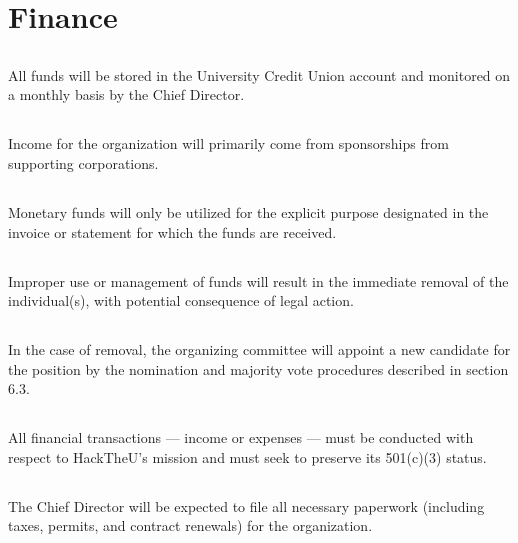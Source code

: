 \documentclass[12pt]{article}
\begin{document}
\section{Finance}

\subsection{} All funds will be stored in the University Credit Union account and 
monitored on a monthly basis by the Chief Director.

\subsection{} Income for the organization will primarily come from sponsorships from
supporting corporations.

\subsection{} Monetary funds will only be utilized for the explicit purpose designated in 
the invoice or statement for which the funds are received.

\subsection{} Improper use or management of funds will result in the immediate removal
of the individual(s), with potential consequence of legal action.

\subsection{} In the case of removal, the organizing committee will appoint a new
candidate for the position by the nomination and majority vote procedures described in
section 6.3.

\subsection{} All financial transactions --- income or expenses --- must be conducted
with respect to HackTheU's mission and must seek to preserve its 501(c)(3) status.

\subsection{} The Chief Director will be expected to file all necessary paperwork 
(including taxes, permits, and contract renewals) for the organization.
\end{document}
